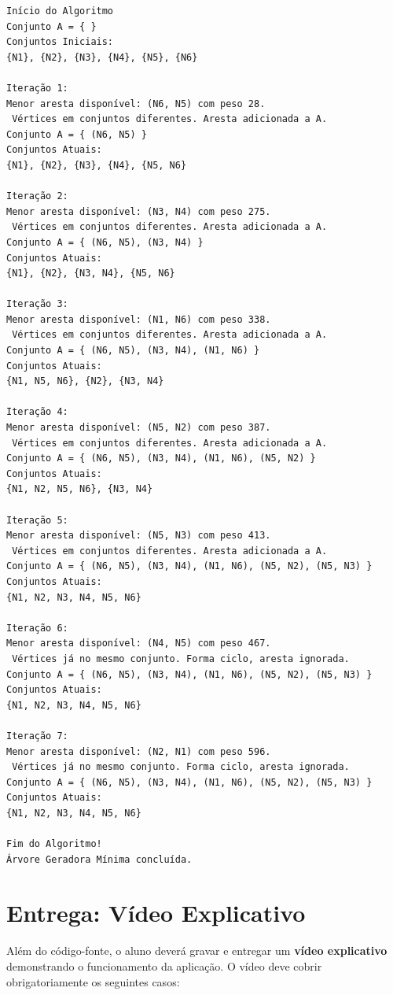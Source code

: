 \documentclass[12pt,a4paper]{article}
\begin{document}
\begin{verbatim}
Início do Algoritmo
Conjunto A = { }
Conjuntos Iniciais:
{N1}, {N2}, {N3}, {N4}, {N5}, {N6}

Iteração 1:
Menor aresta disponível: (N6, N5) com peso 28.
 Vértices em conjuntos diferentes. Aresta adicionada a A.
Conjunto A = { (N6, N5) }
Conjuntos Atuais:
{N1}, {N2}, {N3}, {N4}, {N5, N6}

Iteração 2:
Menor aresta disponível: (N3, N4) com peso 275.
 Vértices em conjuntos diferentes. Aresta adicionada a A.
Conjunto A = { (N6, N5), (N3, N4) }
Conjuntos Atuais:
{N1}, {N2}, {N3, N4}, {N5, N6}

Iteração 3:
Menor aresta disponível: (N1, N6) com peso 338.
 Vértices em conjuntos diferentes. Aresta adicionada a A.
Conjunto A = { (N6, N5), (N3, N4), (N1, N6) }
Conjuntos Atuais:
{N1, N5, N6}, {N2}, {N3, N4}

Iteração 4:
Menor aresta disponível: (N5, N2) com peso 387.
 Vértices em conjuntos diferentes. Aresta adicionada a A.
Conjunto A = { (N6, N5), (N3, N4), (N1, N6), (N5, N2) }
Conjuntos Atuais:
{N1, N2, N5, N6}, {N3, N4}

Iteração 5:
Menor aresta disponível: (N5, N3) com peso 413.
 Vértices em conjuntos diferentes. Aresta adicionada a A.
Conjunto A = { (N6, N5), (N3, N4), (N1, N6), (N5, N2), (N5, N3) }
Conjuntos Atuais:
{N1, N2, N3, N4, N5, N6}

Iteração 6:
Menor aresta disponível: (N4, N5) com peso 467.
 Vértices já no mesmo conjunto. Forma ciclo, aresta ignorada.
Conjunto A = { (N6, N5), (N3, N4), (N1, N6), (N5, N2), (N5, N3) }
Conjuntos Atuais:
{N1, N2, N3, N4, N5, N6}

Iteração 7:
Menor aresta disponível: (N2, N1) com peso 596.
 Vértices já no mesmo conjunto. Forma ciclo, aresta ignorada.
Conjunto A = { (N6, N5), (N3, N4), (N1, N6), (N5, N2), (N5, N3) }
Conjuntos Atuais:
{N1, N2, N3, N4, N5, N6}

Fim do Algoritmo!
Árvore Geradora Mínima concluída.
\end{verbatim}

\section*{Entrega: Vídeo Explicativo}

Além do código-fonte, o aluno deverá gravar e entregar um \textbf{vídeo explicativo} demonstrando o funcionamento da aplicação. O vídeo deve cobrir obrigatoriamente os seguintes casos:
\end{document}
